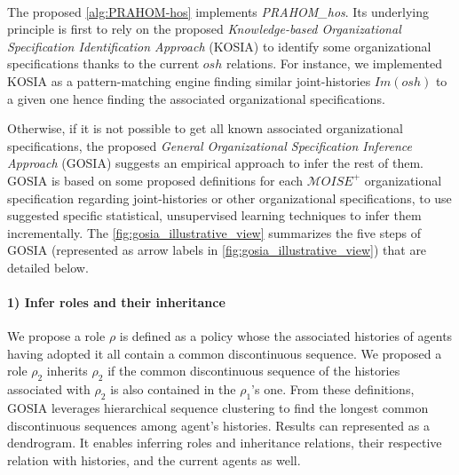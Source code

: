 \documentclass[runningheads]{llncs}
\newcounter{relation}
\begin{document}



\

\noindent The proposed \autoref{alg:PRAHOM-hos} implements \emph{PRAHOM\_hos}. Its underlying principle is first to rely on the proposed \emph{Knowledge-based Organizational Specification Identification Approach} (KOSIA) to identify some organizational specifications thanks to the current $osh$ relations. %
For instance, we implemented KOSIA as a pattern-matching engine finding similar joint-histories $Im(osh)$ to a given one hence finding the associated organizational specifications.

Otherwise, if it is not possible to get all known associated organizational specifications, the proposed \emph{General Organizational Specification Inference Approach} (GOSIA) suggests an empirical approach to infer the rest of them.
GOSIA is based on some proposed definitions for each $\mathcal{M}OISE^+$ organizational specification regarding joint-histories or other organizational specifications, to use suggested specific statistical, unsupervised learning techniques to infer them incrementally. The \autoref{fig:gosia_illustrative_view} summarizes the five steps of GOSIA (represented as arrow labels in \autoref{fig:gosia_illustrative_view}) that are detailed below.
%
\paragraph{1) Infer roles and their inheritance}

We propose a role $\rho$ is defined as a policy whose the associated histories of agents having adopted it all contain a common discontinuous sequence. We proposed a role $\rho_2$ inherits $\rho_2$ if the common discontinuous sequence of the histories associated with $\rho_2$ is also contained in the $\rho_1$'s one.
From these definitions, GOSIA leverages hierarchical sequence clustering to find the longest common discontinuous sequences among agent's histories. Results can represented as a dendrogram. It enables inferring roles and inheritance relations, their respective relation with histories, and the current agents as well.
\end{document}
